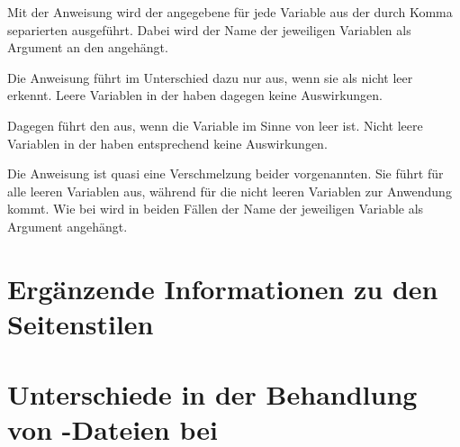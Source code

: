 \begin{Declaration}
\end{Declaration}
Mit der Anweisung
 wird der angegebene  für jede Variable
aus der durch Komma separierten  ausgeführt. Dabei wird
der Name der jeweiligen Variablen als Argument an den 
angehängt.

Die Anweisung  führt im Unterschied dazu
 nur aus, wenn  sie als
nicht leer erkennt. Leere Variablen in der  haben
dagegen keine Auswirkungen.

Dagegen führt  den  aus, wenn die
Variable im Sinne von  leer ist. Nicht
leere Variablen in der  haben entsprechend keine
Auswirkungen.

Die Anweisung  ist quasi eine Verschmelzung
beider vorgenannten. Sie führt  für alle leeren Variablen
aus, während  für die nicht leeren Variablen zur Anwendung
kommt. Wie bei  wird in beiden Fällen der Name der jeweiligen
Variable als Argument angehängt.%
\EndIndexGroup
%
\EndIndexGroup


\section{Ergänzende Informationen zu den Seitenstilen}
\BeginIndexGroup
{}

%
\EndIndexGroup

\iffalse%
\section{Unterschiede in der Behandlung von -Dateien bei
  }
\BeginIndexGroup
{}

